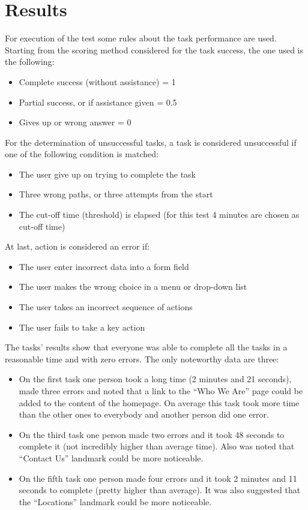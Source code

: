 %
%
\chapter{Results}
For execution of the test some rules about the task performance are used.
Starting from the scoring method considered for the task success, the one used is the following:
\begin{itemize}
\item Complete success (without assistance) = 1
\item Partial success, or if assistance given = 0.5
\item Gives up or wrong answer = 0
\end{itemize}
For the determination of unsuccessful tasks, a task is considered unsuccessful if one of the following condition is matched:
\begin{itemize}
\item The user give up on trying to complete the task
\item Three wrong paths, or three attempts from the start
\item The cut-off time (threshold) is elapsed (for this test 4 minutes are chosen as cut-off time)
\end{itemize}
At last, action is considered an error if:
\begin{itemize}
\item The user enter incorrect data into a form field
\item The user makes the wrong choice in a menu or drop-down list
\item The user takes an incorrect sequence of actions
\item The user fails to take a key action
\end{itemize}
The tasks' results show that everyone was able to complete all the tasks in a reasonable time and with zero errors. The only noteworthy data are three:
\begin{itemize}
\item On the first task one person took a long time (2 minutes and 21 seconds), made three errors and noted that a link to the ``Who We Are'' page could be added to the content of the homepage. On average this task took more time than the other ones to everybody and another person did one error.
\item On the third task one person made two errors and it took 48 seconds to complete it (not incredibly higher than average time). Also was noted that ``Contact Us'' landmark could be more noticeable.
\item On the fifth task one person made four errors and it took 2 minutes and 11 seconds to complete (pretty higher than average). It was also suggested that the ``Locations'' landmark could be more noticeable.
\end{itemize}
